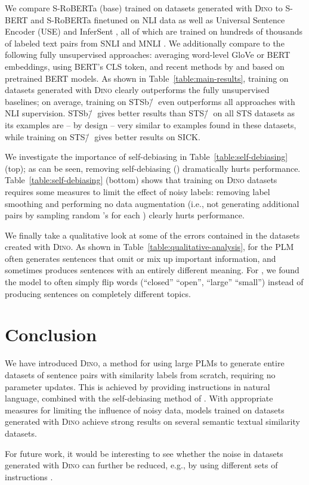 \documentclass[11pt]{article}
\newcommand\ours{\textsc{Dino}}
\newcommand\ourDsFull{STS\=/🦕}
\newcommand\ourDsSemi{STSb\=/🦕}
\begin{document}
We compare S-RoBERTa (base) trained on datasets generated
with \ours{} to S-BERT and S-RoBERTa finetuned on NLI data
as well as Universal Sentence Encoder
(USE) \citep{cer-etal-2018-universal} and
InferSent \citep{conneau-etal-2017-supervised}, all of which
are trained on hundreds of thousands of labeled text pairs
from SNLI \citep{bowman-etal-2015-large} and
MNLI \citep{williams2018mnli}. We additionally compare to
the following fully unsupervised approaches: averaging word-level GloVe \citep{Glove} or BERT \citep{devlin2018bert} embeddings, using BERT's CLS token, and recent methods by \citet{zhang-etal-2020-unsupervised} and \citet{li-etal-2020-sentence} based on pretrained BERT models. As shown in Table~\ref{table:main-results}, training on datasets generated with \ours{} clearly outperforms the fully unsupervised baselines; on average, training on \ourDsSemi{} even outperforms all approaches with NLI supervision. \ourDsSemi{} gives better results than \ourDsFull{} on all STS datasets as its examples are -- by design -- very similar to examples found in these datasets, while training on \ourDsFull{} gives better results on SICK.

We investigate the importance of self-debiasing \citep{schick2021selfdiagnosis} in Table~\ref{table:self-debiasing} (top); as can be seen, removing self-debiasing () dramatically hurts performance. Table~\ref{table:self-debiasing} (bottom) shows that training on \ours{} datasets requires some measures to limit the effect of noisy labels: removing label smoothing and performing no data augmentation (i.e., not generating additional pairs  by sampling random 's for each ) clearly hurts performance.

We finally take a qualitative look at some of the errors contained in the datasets created with \ours{}. As shown in Table~\ref{table:qualitative-analysis}, for  the PLM often generates sentences that omit or mix up important information, and sometimes produces sentences with an entirely different meaning. For , we found the model to often simply flip words (``closed''  ``open'', ``large''  ``small'') instead of producing sentences on completely different topics.

\section{Conclusion}

We have introduced \ours{}, a method for using large PLMs to generate entire datasets of sentence pairs with similarity labels from scratch, requiring no parameter updates. This is achieved by providing instructions in natural language, combined with the self-debiasing method of \citet{schick2021selfdiagnosis}. With appropriate measures for limiting the influence of noisy data, models trained on datasets generated with \ours{} achieve strong results on several semantic textual similarity datasets. 

For future work, it would be interesting to see whether the noise in datasets generated with \ours{} can further be reduced, e.g., by using different sets of instructions \citep{jiang2019know,schick2020exploiting}.



\end{document}
